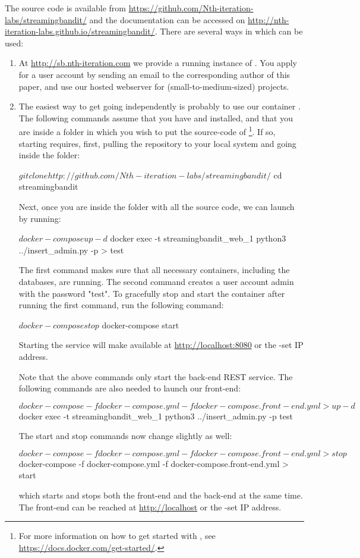 \documentclass[nojss]{jss}
\begin{document}
The  source code is available  from
\url{https://github.com/Nth-iteration-labs/streamingbandit/} and the documentation can be accessed on \url{http://nth-iteration-labs.github.io/streamingbandit/}. There are several ways in which  can be used:
\begin{enumerate}
\item At \url{http://sb.nth-iteration.com} we provide a running instance of . You apply for a user account by sending an email to the corresponding author of this paper, and use our hosted webserver for (small-to-medium-sized) projects.
\item The easiest way to get going independently is probably to use our  container \citep{docker}. The following commands assume that you have  and  installed, and that you are inside a folder in which you wish to put the source-code of \footnote{For more information on how to get started with , see \url{https://docs.docker.com/get-started/}.}. If so, starting
 requires, first, pulling the repository to your local system and going inside the folder:
\begin{Code}
$ git clone http://github.com/Nth-iteration-labs/streamingbandit/
$ cd streamingbandit
\end{Code}
Next, once you are inside the folder with all the source code, we can launch  by running:
\begin{Code} 
$ docker-compose up -d
$ docker exec -t streamingbandit_web_1 python3 ../insert_admin.py -p 
> test
\end{Code}
The first command makes sure that all necessary containers, including the databases, are running. The second command creates a user account admin with the password "test". To gracefully stop and start the container after running the first command, run the following command:
\begin{Code}
$ docker-compose stop
$ docker-compose start
\end{Code}
Starting the service will make  available at \url{http://localhost:8080} or the -set IP address.

Note that the above commands only start the back-end REST service. The following commands are also needed to launch our front-end:
\begin{Code}
$ docker-compose -f docker-compose.yml -f docker-compose.front-end.yml 
> up -d
$ docker exec -t streamingbandit_web_1 python3 ../insert_admin.py -p 
  test
\end{Code}
The start and stop commands now change slightly as well:
\begin{Code}
$ docker-compose -f docker-compose.yml -f docker-compose.front-end.yml 
> stop
$ docker-compose -f docker-compose.yml -f docker-compose.front-end.yml 
> start
\end{Code}
which starts and stops both the front-end and the back-end at the same time. The front-end can be reached at \url{http://localhost} or the -set IP address.


\end{enumerate}
\end{document}
